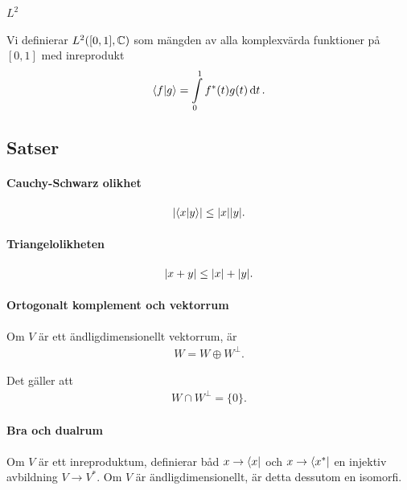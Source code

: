 \paragraph{$L^{2}$}
Vi definierar $L^{2}([0, 1], \mathbb{C})$ som mängden av alla komplexvärda funktioner på $[0, 1]$ med inreprodukt
\begin{align*}
	\bra{f}\ket{g} = \int\limits_{0}^{1}f^{*}(t)g(t)\dd{t}.
\end{align*}

\subsection{Satser}

\paragraph{Cauchy-Schwarz olikhet}

\begin{align*}
	\abs{\bra{x}\ket{y}} \leq \abs{x}\abs{y}.
\end{align*}

\proof

\paragraph{Triangelolikheten}

\begin{align*}
	\abs{x + y} \leq \abs{x} + \abs{y}.
\end{align*}

\paragraph{Ortogonalt komplement och vektorrum}
Om $V$ är ett ändligdimensionellt vektorrum, är
\begin{align*}
	W = W \oplus W^{\perp}.
\end{align*}

\proof
Det gäller att
\begin{align*}
	W \cap W^{\perp} = \{0\}.
\end{align*}

\paragraph{Bra och dualrum}
Om $V$ är ett inreproduktum, definierar båd $x\to\bra{x}$ och $x\to\bra{x^{*}}$ en injektiv avbildning $V\to V^{*}$. Om $V$ är ändligdimensionellt, är detta dessutom en isomorfi.

